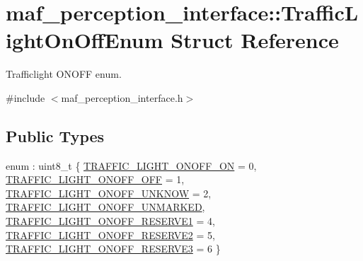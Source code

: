 \hypertarget{structmaf__perception__interface_1_1TrafficLightOnOffEnum}{}\section{maf\+\_\+perception\+\_\+interface\+:\+:Traffic\+Light\+On\+Off\+Enum Struct Reference}
\label{structmaf__perception__interface_1_1TrafficLightOnOffEnum}


Trafficlight O\+N\+O\+FF enum.  




{\ttfamily \#include $<$maf\+\_\+perception\+\_\+interface.\+h$>$}

\subsection*{Public Types}
\begin{DoxyCompactItemize}
\item 
enum \+: uint8\+\_\+t \{ \newline
\hyperlink{structmaf__perception__interface_1_1TrafficLightOnOffEnum_a5c6b1103bef4a2077abedcc7999bef03a43e0548fd634df18387a2489a57b78db}{T\+R\+A\+F\+F\+I\+C\+\_\+\+L\+I\+G\+H\+T\+\_\+\+O\+N\+O\+F\+F\+\_\+\+ON} = 0, 
\hyperlink{structmaf__perception__interface_1_1TrafficLightOnOffEnum_a5c6b1103bef4a2077abedcc7999bef03a77590a37fcc56289f4245e0c53da7360}{T\+R\+A\+F\+F\+I\+C\+\_\+\+L\+I\+G\+H\+T\+\_\+\+O\+N\+O\+F\+F\+\_\+\+O\+FF} = 1, 
\hyperlink{structmaf__perception__interface_1_1TrafficLightOnOffEnum_a5c6b1103bef4a2077abedcc7999bef03ace4fe9c6bed4b4b0130cf7433d63b2d9}{T\+R\+A\+F\+F\+I\+C\+\_\+\+L\+I\+G\+H\+T\+\_\+\+O\+N\+O\+F\+F\+\_\+\+U\+N\+K\+N\+OW} = 2, 
\hyperlink{structmaf__perception__interface_1_1TrafficLightOnOffEnum_a5c6b1103bef4a2077abedcc7999bef03a1dff3134cd90ceb3c387c627756972fd}{T\+R\+A\+F\+F\+I\+C\+\_\+\+L\+I\+G\+H\+T\+\_\+\+O\+N\+O\+F\+F\+\_\+\+U\+N\+M\+A\+R\+K\+ED}, 
\newline
\hyperlink{structmaf__perception__interface_1_1TrafficLightOnOffEnum_a5c6b1103bef4a2077abedcc7999bef03a347b7247cc6f39b119be3215ab854a4f}{T\+R\+A\+F\+F\+I\+C\+\_\+\+L\+I\+G\+H\+T\+\_\+\+O\+N\+O\+F\+F\+\_\+\+R\+E\+S\+E\+R\+V\+E1} = 4, 
\hyperlink{structmaf__perception__interface_1_1TrafficLightOnOffEnum_a5c6b1103bef4a2077abedcc7999bef03a48669d4faf399848477e4d1621e48a4b}{T\+R\+A\+F\+F\+I\+C\+\_\+\+L\+I\+G\+H\+T\+\_\+\+O\+N\+O\+F\+F\+\_\+\+R\+E\+S\+E\+R\+V\+E2} = 5, 
\hyperlink{structmaf__perception__interface_1_1TrafficLightOnOffEnum_a5c6b1103bef4a2077abedcc7999bef03a7126b1d58f51fc410c96b70ca7d8670f}{T\+R\+A\+F\+F\+I\+C\+\_\+\+L\+I\+G\+H\+T\+\_\+\+O\+N\+O\+F\+F\+\_\+\+R\+E\+S\+E\+R\+V\+E3} = 6
 \}
\end{DoxyCompactItemize}
